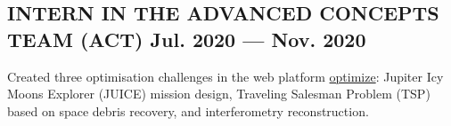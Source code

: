 \documentclass[letter,10pt]{article}
\begin{document}
\subsection{{INTERN IN THE ADVANCED CONCEPTS TEAM (ACT) \hfill Jul. 2020  --- Nov. 2020}}
\begin{zitemize}
\item Created three optimisation challenges in the web platform \href{https://optimize.esa.int/}{optimize}: Jupiter Icy Moons Explorer (JUICE) mission design, Traveling Salesman Problem (TSP) based on space debris recovery, and interferometry reconstruction.
\end{zitemize}

\end{document}
